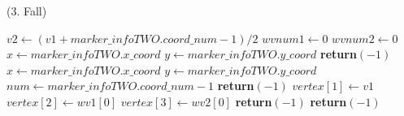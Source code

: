 \begin{algorithm}[!ht]
\caption{ (3. Fall)}
\label{alg:checksquare-6}
\begin{algorithmic}[1]
		\State $\mathit{v2} \gets (\mathit{v1} + \mathit{marker\_infoTWO.coord\_num} - 1) / 2$
		\label{alg:checksquare-6-v2}
		\State $\mathit{wvnum1} \gets 0$
		\State $\mathit{wvnum2} \gets 0$
		\State $x \gets \mathit{marker\_infoTWO.x\_coord}$
		\State $y \gets \mathit{marker\_infoTWO.y\_coord}$
		\label{alg:checksquare-6-vertex1}
			\State \textbf{return}$(-1)$
		\EndIf
		\State $x \gets \mathit{marker\_infoTWO.x\_coord}$
		\State $y \gets \mathit{marker\_infoTWO.y\_coord}$
		\State $\mathit{num} \gets \mathit{marker\_infoTWO.coord\_num} - 1$
		\label{alg:checksquare-6-vertex2}
			\State \textbf{return}$(-1)$
		\EndIf
			\State $\mathit{vertex}[1] \gets \mathit{v1}$
			\State $\mathit{vertex}[2] \gets \mathit{wv1}[0]$
			\State $\mathit{vertex}[3] \gets \mathit{wv2}[0]$
		\Else
			\State \textbf{return}$(-1)$
		\EndIf
	\Else
		\State \textbf{return}$(-1)$
	\EndIf
\end{algorithmic}
\end{algorithm}
